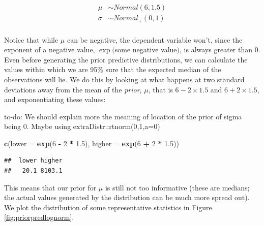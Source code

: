 \documentclass[12pt,]{krantz}
\makeatletter
\newenvironment{Shaded}{\begin{snugshade}}{\end{snugshade}}
\newcommand{\DataTypeTok}[1]{\textcolor[rgb]{0.13,0.29,0.53}{#1}}
\newcommand{\DecValTok}[1]{\textcolor[rgb]{0.00,0.00,0.81}{#1}}
\newcommand{\FloatTok}[1]{\textcolor[rgb]{0.00,0.00,0.81}{#1}}
\newcommand{\KeywordTok}[1]{\textcolor[rgb]{0.13,0.29,0.53}{\textbf{#1}}}
\newcommand{\NormalTok}[1]{#1}
\newcommand{\OperatorTok}[1]{\textcolor[rgb]{0.81,0.36,0.00}{\textbf{#1}}}
\newcommand{\StringTok}[1]{\textcolor[rgb]{0.31,0.60,0.02}{#1}}
\newenvironment{kframe}{%
\medskip{}
\setlength{\fboxsep}{.8em}
 \def\at@end@of@kframe{}%
 \ifinner\ifhmode%
  \def\at@end@of@kframe{\end{minipage}}%
  \begin{minipage}{\columnwidth}%
 \fi\fi%
 \def\FrameCommand##1{\hskip\@totalleftmargin \hskip-\fboxsep
 \colorbox{shadecolor}{##1}\hskip-\fboxsep
     \hskip-\linewidth \hskip-\@totalleftmargin \hskip\columnwidth}%
 \MakeFramed {\advance\hsize-\width
   \@totalleftmargin\z@ \linewidth\hsize
   \@setminipage}}%
 {\par\unskip\endMakeFramed%
 \at@end@of@kframe}
\newenvironment{rmdblock}[1]
  {
  \begin{itemize}
  \renewcommand{\labelitemi}{
    \raisebox{-.7\height}[0pt][0pt]{
      {\setkeys{Gin}{width=3em,keepaspectratio}\texttt{[image: images/\#1]}}
    }
  }
  \setlength{\fboxsep}{1em}
  \begin{kframe}
  \item
  }
  {
  \end{kframe}
  \end{itemize}
  }
\newenvironment{rmdnote}
  {\begin{rmdblock}{note}}
  {\end{rmdblock}}
\theoremstyle{definition}
\theoremstyle{definition}
\theoremstyle{definition}
\theoremstyle{remark}
\makeatother
\begin{document}
\begin{equation}
\begin{aligned}
\mu &\sim Normal(6, 1.5) \\
\sigma &\sim Normal_+(0, 1) \\
\end{aligned}
\label{eq:logpriorsnorm}
\end{equation}

Notice that while \(\mu\) can be negative, the dependent variable won't, since the exponent of a negative value, \(\exp(\)some negative value\()\), is always greater than \(0\). Even before generating the prior predictive distributions, we can calculate the values within which we are 95\% sure that the expected median of the observations will lie. We do this by looking at what happens at two standard deviations away from the mean of the \emph{prior}, \(\mu\), that is \(6 - 2\times 1.5\) and \(6 + 2\times 1.5\), and exponentiating these values:

\begin{rmdnote}
to-do: We should explain more the meaning of location of the prior of sigma being 0. Maybe using extraDistr::rtnorm(0,1,a=0)
\end{rmdnote}

\begin{Shaded}
\begin{Highlighting}[]
\KeywordTok{c}\NormalTok{(}\DataTypeTok{lower =} \KeywordTok{exp}\NormalTok{(}\DecValTok{6} \OperatorTok{-}\StringTok{ }\DecValTok{2} \OperatorTok{*}\StringTok{ }\FloatTok{1.5}\NormalTok{),}
  \DataTypeTok{higher =} \KeywordTok{exp}\NormalTok{(}\DecValTok{6} \OperatorTok{+}\StringTok{ }\DecValTok{2} \OperatorTok{*}\StringTok{ }\FloatTok{1.5}\NormalTok{))}
\end{Highlighting}
\end{Shaded}

\begin{verbatim}
##  lower higher 
##   20.1 8103.1
\end{verbatim}

This means that our prior for \(\mu\) is still not too informative (these are medians; the actual values generated by the distribution can be much more spread out). We plot the distribution of some representative statistics in Figure \ref{fig:priorpredlognorm}.
\end{document}
